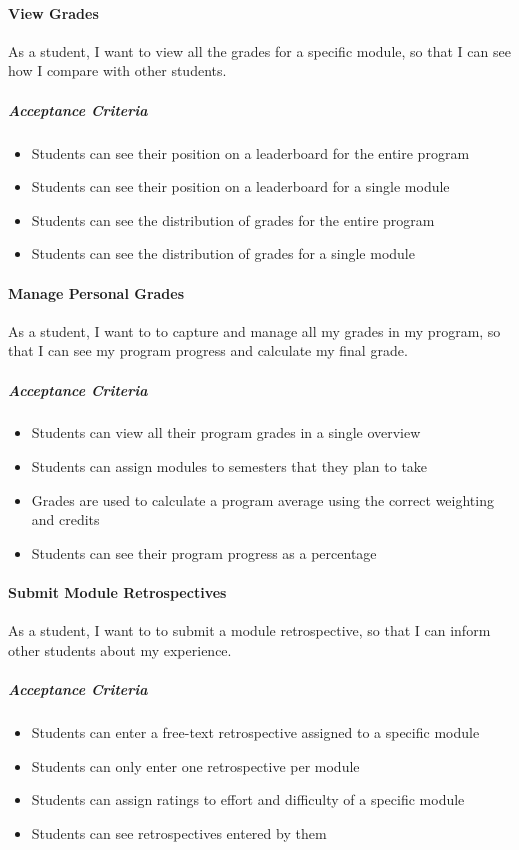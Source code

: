 \paragraph{View Grades} As a student, I want to view all the grades for a specific module, so that I can see how I compare with other students.
\subparagraph{Acceptance Criteria}
\begin{itemize}
    \item Students can see their position on a leaderboard for the entire program
    \item Students can see their position on a leaderboard for a single module
    \item Students can see the distribution of grades for the entire program
    \item Students can see the distribution of grades for a single module
\end{itemize}


\paragraph{Manage Personal Grades} As a student, I want to to capture and manage all my grades in my program, so that I can see my program progress and calculate my final grade.
\subparagraph{Acceptance Criteria}
\begin{itemize}
    \item Students can view all their program grades in a single overview
    \item Students can assign modules to semesters that they plan to take
    \item Grades are used to calculate a program average using the correct weighting and credits
    \item Students can see their program progress as a percentage
\end{itemize}

\paragraph{Submit Module Retrospectives} As a student, I want to to submit a module retrospective, so that I can inform other students about my experience.
\subparagraph{Acceptance Criteria}
\begin{itemize}
    \item Students can enter a free-text retrospective assigned to a specific module
    \item Students can only enter one retrospective per module
    \item Students can assign ratings to effort and difficulty of a specific module
    \item Students can see retrospectives entered by them
\end{itemize}

